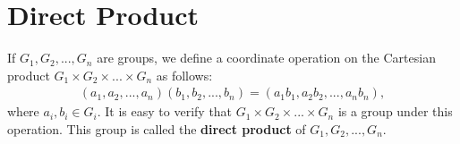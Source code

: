 \section{Direct Product}

\begin{definition} 
    
If $G_1, G_2,..., G_n$ are groups, we define a coordinate operation on the Cartesian product $G_1 \times G_2 \times...\times G_n$ as follows:
\begin{align*} (a_1, a_2, ..., a_n) (b_1, b_2, ..., b_n) = (a_1 b_1, a_2 b_2, ..., a_n b_n),
\end{align*}
where $a_i, b_i \in G_i$. It is easy to verify that $G_1 \times G_2 \times...\times G_n$ is a group under this operation. This group is called the \textbf{direct product} of $G_1, G_2,...,G_n$.
\end{definition}


